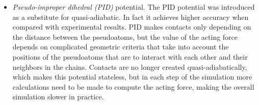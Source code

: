 \begin{itemize}
    \item \emph{Pseudo-improper dihedral (PID)} potential. The PID potential was introduced as a substitute for quasi-adiabatic. In fact it achieves higher accuracy when compared with experimental results. PID makes contacts only depending on the distance between the pseudoatoms, but the value of the acting force depends on complicated geometric criteria that take into account the positions of the pseudoatoms that are to interact with each other and their neighbors in the chains. Contacts are no longer created quasi-adiabatically, which makes this potential stateless, but in each step of the simulation more calculations need to be made to compute the acting force, making the overall simulation slower in practice.

\end{itemize}



